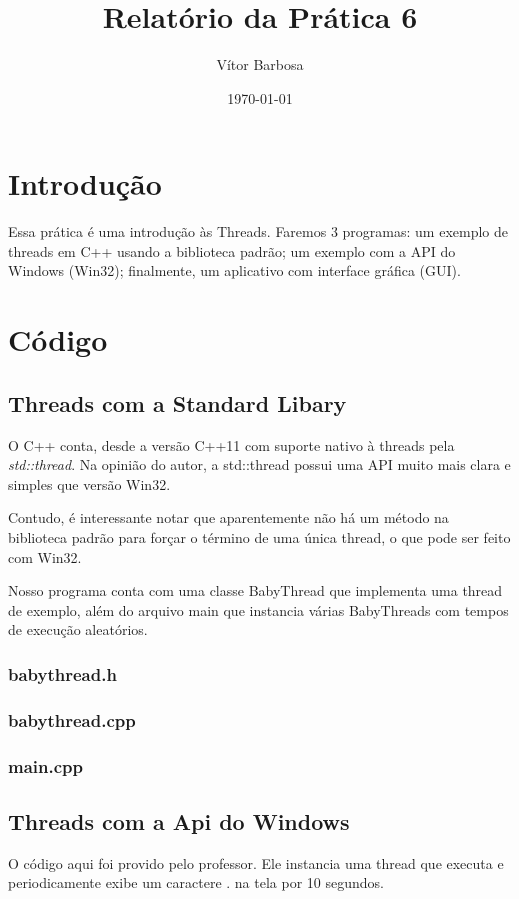 \documentclass[12pt,a4paper]{article}
\title{Relatório da Prática 6}
\author{Vítor Barbosa}
\date{\today}
\begin{document}
\maketitle
\section{Introdução}
Essa prática é uma introdução às Threads. Faremos 3 programas: um exemplo de threads em C++ usando a biblioteca padrão; um exemplo com a API do Windows (Win32); finalmente, um aplicativo com interface gráfica (GUI).
\section{Código}
\subsection{Threads com a Standard Libary}
O C++ conta, desde a versão C++11 com suporte nativo à threads pela \emph{std::thread}. Na opinião do autor, a std::thread possui uma API muito mais clara e simples que versão Win32.

Contudo, é interessante notar que aparentemente não há um método na biblioteca padrão para forçar o término de uma única thread, o que pode ser feito com Win32.

Nosso programa conta com uma classe BabyThread que implementa uma thread de exemplo, além do arquivo main que instancia várias BabyThreads com tempos de execução aleatórios.

\subsubsection*{babythread.h}

\subsubsection*{babythread.cpp}

\subsubsection*{main.cpp}


\subsection{Threads com a Api do Windows}
O código aqui foi provido pelo professor. Ele instancia uma thread que executa e periodicamente exibe um caractere . na tela por 10 segundos.
\\

\end{document}

